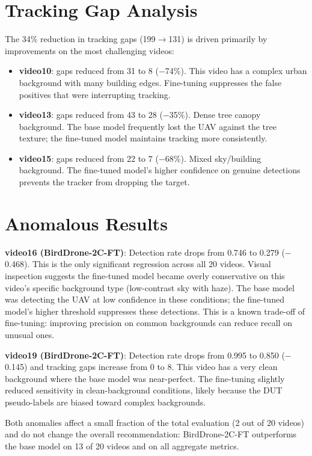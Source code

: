\documentclass[12pt,a4paper]{report}
\begin{document}
\section{Tracking Gap Analysis}

The 34\% reduction in tracking gaps (199$\to$131) is driven primarily by
improvements on the most challenging videos:

\begin{itemize}
  \item \textbf{video10}: gaps reduced from 31 to 8 ($-$74\%). This video
        has a complex urban background with many building edges. Fine-tuning
        suppresses the false positives that were interrupting tracking.
  \item \textbf{video13}: gaps reduced from 43 to 28 ($-$35\%). Dense tree
        canopy background. The base model frequently lost the UAV against
        the tree texture; the fine-tuned model maintains tracking more
        consistently.
  \item \textbf{video15}: gaps reduced from 22 to 7 ($-$68\%). Mixed
        sky/building background. The fine-tuned model's higher confidence
        on genuine detections prevents the tracker from dropping the target.
\end{itemize}

\section{Anomalous Results}

\textbf{video16 (BirdDrone-2C-FT)}: Detection rate drops from 0.746 to 0.279
($-$0.468). This is the only significant regression across all 20 videos.
Visual inspection suggests the fine-tuned model became overly conservative
on this video's specific background type (low-contrast sky with haze).
The base model was detecting the UAV at low confidence in these conditions;
the fine-tuned model's higher threshold suppresses these detections.
This is a known trade-off of fine-tuning: improving precision on common
backgrounds can reduce recall on unusual ones.

\textbf{video19 (BirdDrone-2C-FT)}: Detection rate drops from 0.995 to 0.850
($-$0.145) and tracking gaps increase from 0 to 8. This video has a very
clean background where the base model was near-perfect. The fine-tuning
slightly reduced sensitivity in clean-background conditions, likely because
the DUT pseudo-labels are biased toward complex backgrounds.

Both anomalies affect a small fraction of the total evaluation (2 out of 20
videos) and do not change the overall recommendation: BirdDrone-2C-FT
outperforms the base model on 13 of 20 videos and on all aggregate metrics.
\end{document}
